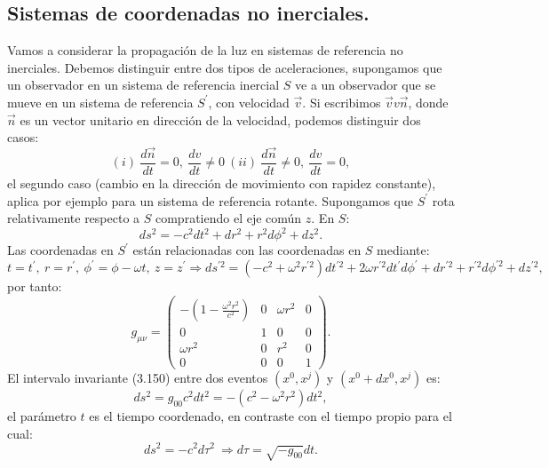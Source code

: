 \subsection{Sistemas de coordenadas no inerciales.}
Vamos a considerar la propagación de la luz en sistemas de referencia no inerciales. Debemos distinguir entre dos tipos de aceleraciones, supongamos que un observador en un sistema de referencia inercial $S$ ve a un observador que se mueve en un sistema de referencia $S^{'}$, con velocidad $\vec{v}$. Si escribimos $\vec{v}v\vec{n}$, donde $\vec{n}$ es un vector unitario en dirección de la velocidad, podemos distinguir dos casos:
\begin{equation}
(i)\ \frac{d\vec{n}}{dt}=0,\ \frac{dv}{dt}\neq0\ (ii)\ \frac{d\vec{n}}{dt}\neq0,\ \frac{dv}{dt}=0,
\end{equation}
el segundo caso (cambio en la dirección de movimiento con rapidez constante), aplica por ejemplo para un sistema de referencia rotante. Supongamos que $S^{'}$ rota relativamente respecto a $S$ compratiendo el eje común $z$. En $S$:
\begin{equation}
ds^{2}=-c^{2}dt^{2}+dr^{2}+r^{2}d\phi^{2}+dz^{2}.
\end{equation}
Las coordenadas en $S^{'}$ están relacionadas con las coordenadas en $S$ mediante:
\begin{equation}
t=t^{'},\ r=r^{'},\ \phi^{'}=\phi-\omega t,\ z=z^{'}\Rightarrow ds^{'2}=(-c^{2}+\omega^{2}r^{'2})dt^{'2}+2\omega r^{'2}dt^{'}d\phi^{'}+dr^{'2}+r^{'2}d\phi^{'2}+dz^{'2},
\end{equation}
por tanto:
\begin{equation}
g_{\mu\nu}=\left(\begin{array}{cccc}
-\left(1-\frac{\omega^{2}r^{2}}{c^{2}}\right) & 0 & \omega r^{2} & 0\\
0 & 1 & 0 & 0\\
\omega r^{2} & 0 & r^{2} & 0\\
0 & 0 & 0 & 1
\end{array}\right) .
\end{equation}
El intervalo invariante (3.150) entre dos eventos $(x^0,x^j)$ y $(x^0+dx^0,x^j)$ es:
\begin{equation}
ds^2=g_{00}c^2dt^2=-(c^2-\omega^2r^2)dt^2,
\end{equation} 
el parámetro $t$ es el tiempo coordenado, en contraste con el tiempo propio para el cual:
\begin{equation}
ds^2=-c^2d\tau^2 \ \Rightarrow d\tau=\sqrt{-g_{00}}dt. 
\end{equation}

